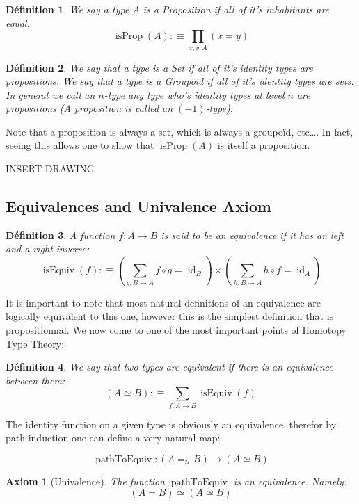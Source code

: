 \documentclass{article}
\DeclareMathOperator{\id}{id}
\DeclareMathOperator{\isprop}{isProp}
\DeclareMathOperator{\isequiv}{isEquiv}
\DeclareMathOperator{\pathtoequiv}{pathToEquiv}
\newtheorem{definition}{Définition}[section]
\newtheorem{axiom}{Axiom}[section]
\begin{document}
\begin{definition}
  We say a type $A$ is a \emph{Proposition} if all of it's inhabitants are equal.
  \[\isprop(A) :\equiv \prod_{x,y : A}(x = y)\]
\end{definition}

\begin{definition}
  We say that a type is a \emph{Set} if all of it's identity types are propositions. We say that a type is a \emph{Groupoïd} if all of it's identity types are sets. In general we call an \emph{$n$-type} any type who's identity types at level $n$ are propositions (A proposition is called an $(-1)$-type).
\end{definition}

Note that a proposition is always a set, which is always a groupoïd, etc\ldots. In fact, seeing this allows one to show that $\isprop(A)$ is itself a proposition.

INSERT DRAWING

\subsection{Equivalences and  Univalence Axiom}

\begin{definition}
  A function $f : A \to B$ is said to be an \emph{equivalence} if it has an left and a right inverse:
  \[\isequiv(f) :\equiv \left(  \sum_{g : B \to A} f \circ g = \id_{B} \right) \times \left(  \sum_{h : B \to A}h \circ f = \id_{A} \right) \]
\end{definition}

It is important to note that most natural definitions of an equivalence are logically equivalent to this one, however this is the simplest definition that is propositionnal. We now come to one of the most important points of Homotopy Type Theory:

\begin{definition}
  We say that two types are \emph{equivalent} if there is an equivalence between them:
  \[(A \simeq B) :\equiv \sum_{f : A \to B} \isequiv(f) \]
\end{definition}

The identity function on a given type is obviously an equivalence, therefor by path induction one can define a very natural map:

\[\pathtoequiv : (A =_{\mathcal{U}} B) \to (A \simeq B)\]

\begin{axiom}[Univalence]
  The function $\pathtoequiv$ is an equivalence. Namely:
  \[(A = B) \simeq (A \simeq B)\]
\end{axiom}
\end{document}
